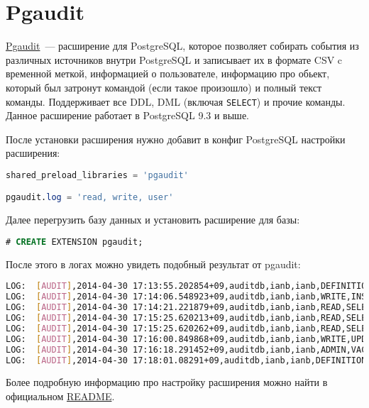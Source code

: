 \section{Pgaudit}

\href{https://github.com/2ndQuadrant/pgaudit}{Pgaudit}~--- расширение для PostgreSQL, которое позволяет собирать события из различных источников внутри PostgreSQL и записывает их в формате CSV c временной меткой, информацией о пользователе, информацию про обьект, который был затронут командой (если такое произошло) и полный текст команды. Поддерживает все DDL, DML (включая \lstinline!SELECT!) и прочие команды. Данное расширение работает в PostgreSQL 9.3 и выше.

После установки расширения нужно добавит в конфиг PostgreSQL настройки расширения:

\begin{lstlisting}[language=SQL,label=lst:pgaudit1,caption=Pgaudit]
shared_preload_libraries = 'pgaudit'

pgaudit.log = 'read, write, user'
\end{lstlisting}

Далее перегрузить базу данных и установить расширение для базы:

\begin{lstlisting}[language=SQL,label=lst:pgaudit2,caption=Pgaudit]
# CREATE EXTENSION pgaudit;
\end{lstlisting}

После этого в логах можно увидеть подобный результат от pgaudit:

\begin{lstlisting}[language=Bash,label=lst:pgaudit3,caption=Pgaudit]
LOG:  [AUDIT],2014-04-30 17:13:55.202854+09,auditdb,ianb,ianb,DEFINITION,CREATE TABLE,TABLE,public.x,CREATE  TABLE  public.x (a pg_catalog.int4   , b pg_catalog.int4   )   WITH (oids=OFF)
LOG:  [AUDIT],2014-04-30 17:14:06.548923+09,auditdb,ianb,ianb,WRITE,INSERT,TABLE,public.x,INSERT INTO x VALUES(1,1);
LOG:  [AUDIT],2014-04-30 17:14:21.221879+09,auditdb,ianb,ianb,READ,SELECT,TABLE,public.x,SELECT * FROM x;
LOG:  [AUDIT],2014-04-30 17:15:25.620213+09,auditdb,ianb,ianb,READ,SELECT,VIEW,public.v_x,SELECT * from v_x;
LOG:  [AUDIT],2014-04-30 17:15:25.620262+09,auditdb,ianb,ianb,READ,SELECT,TABLE,public.x,SELECT * from v_x;
LOG:  [AUDIT],2014-04-30 17:16:00.849868+09,auditdb,ianb,ianb,WRITE,UPDATE,TABLE,public.x,UPDATE x SET a=a+1;
LOG:  [AUDIT],2014-04-30 17:16:18.291452+09,auditdb,ianb,ianb,ADMIN,VACUUM,,,VACUUM x;
LOG:  [AUDIT],2014-04-30 17:18:01.08291+09,auditdb,ianb,ianb,DEFINITION,CREATE FUNCTION,FUNCTION,public.func_x(),CREATE  FUNCTION public.func_x() RETURNS  pg_catalog.int4 LANGUAGE sql  VOLATILE  CALLED ON NULL INPUT SECURITY INVOKER COST 100.000000   AS $dprs_$SELECT a FROM x LIMIT 1;$dprs_$
\end{lstlisting}

Более подробную информацию про настройку расширения можно найти в официальном \href{https://github.com/2ndQuadrant/pgaudit#configuration}{README}.
